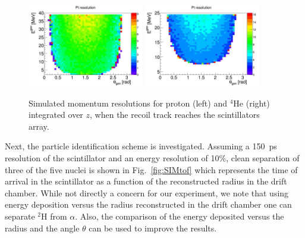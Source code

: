\begin{figure}[tbp]
    \begin{center}
        \includegraphics[width=0.45\textwidth]{./../Detector/fig-chap2/Bare_3atm_1atm_Proton_ResoPt}%
        \includegraphics[width=0.45\textwidth]{./../Detector/fig-chap2/Bare_3atm_1atm_Alpha_ResoPt}%
        \caption{Simulated momentum resolutions for proton (left) and $^4$He (right) integrated over $z$, when the recoil track reaches the scintillators array.\label{fig:presolution}}
    \end{center}
\end{figure}

Next, the particle identification scheme is investigated. Assuming a 150~ps 
resolution of the scintillator and an energy resolution of 10\%, clean 
separation of three of the five nuclei is shown in Fig.~\ref{fig:SIMtof} which 
represents the time of arrival in the scintillator as a function of the 
reconstructed radius in the drift chamber. While not directly a concern for our 
experiment, we note that using energy deposition versus the radius 
reconstructed in the drift chamber one can separate $^2$H from $\alpha$. Also, 
the comparison of the energy deposited versus the radius and the angle $\theta$ 
can be used to improve the results.\\


